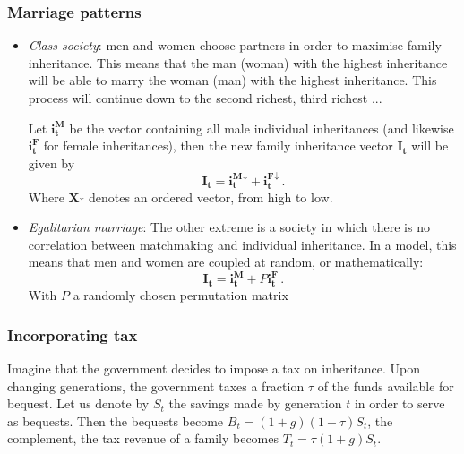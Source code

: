 \subsubsection{Marriage patterns}
\begin{itemize}
\item{\emph{Class society}: men and women choose partners in order to maximise family inheritance. This means that the man (woman) with the highest inheritance will be able to marry the woman (man) with the highest inheritance. This process will continue down to the second richest, third richest ...

Let $\mathbf{i^M_t}$ be the vector containing all male individual inheritances (and likewise $\mathbf{i^F_t}$ for female inheritances), then the new family inheritance vector $\mathbf{I_t}$ will be given by
\begin{equation}
    \mathbf{I_t} = \mathbf{i^M_t}^\downarrow{} + \mathbf{i^F_t}^\downarrow{} \,.
\end{equation}
Where $\mathbf{X}^\downarrow{}$ denotes an ordered vector, from high to low.}
\item{\emph{Egalitarian marriage}: The other extreme is a society in which there is no correlation between matchmaking and individual inheritance. In a model, this means that men and women are coupled at random, or mathematically:
\begin{equation}
    \mathbf{I_t} = \mathbf{i_t^M} + P\mathbf{i_t^F}\,.
\end{equation}}
With $P$ a randomly chosen permutation matrix
\end{itemize}



\subsubsection{Incorporating tax}
Imagine that the government decides to impose a tax on inheritance. Upon changing generations, the government taxes a fraction $\tau$ of the funds available for bequest. Let us denote by $S_t$ the savings made by generation $t$ in order to serve as bequests. Then the bequests become $B_t = (1+g)(1-\tau)S_t$, the complement, the tax revenue of a family becomes $T_t = \tau (1+g)S_t$.

